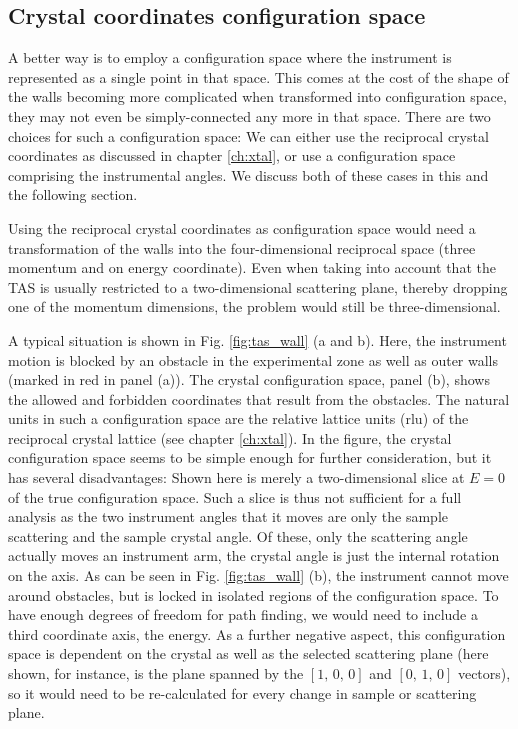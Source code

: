 \subsection{Crystal coordinates configuration space}
A better way is to employ a configuration space where the instrument is represented 
as a single point in that space. 
This comes at the cost of the shape of the walls becoming more complicated when 
transformed into configuration space, they may not even be simply-connected 
any more in that space. 
There are two choices for such a configuration space: We can either use the 
reciprocal crystal coordinates as discussed in chapter \ref{ch:xtal}, or use a 
configuration space comprising the instrumental angles.
We discuss both of these cases in this and the following section.

Using the reciprocal crystal coordinates as configuration space would need a 
transformation of the walls into the four-dimensional reciprocal space 
(three momentum and on energy coordinate). Even when taking into account that 
the TAS is usually restricted to a two-dimensional scattering plane, thereby 
dropping one of the momentum dimensions, the problem would still be three-dimensional.

A typical situation is shown in Fig. \ref{fig:tas_wall} (a and b). 
Here, the instrument motion is blocked by an obstacle in the experimental zone
as well as outer walls (marked in red in panel (a)).
The crystal configuration space, panel (b), shows the allowed and forbidden
coordinates that result from the obstacles. The natural units in such a
configuration space are the relative lattice units (rlu) of the reciprocal
crystal lattice (see chapter \ref{ch:xtal}).
In the figure, the crystal configuration space seems to be simple enough for 
further consideration, but it has several disadvantages: Shown here is merely
a two-dimensional slice at $E = 0$ of the true configuration space.
Such a slice is thus not sufficient for a full analysis as the two instrument
angles that it moves are only the sample scattering and the sample crystal angle.
Of these, only the scattering angle actually moves an instrument arm, the crystal
angle is just the internal rotation on the axis.
As can be seen in Fig. \ref{fig:tas_wall} (b), the instrument cannot move
around obstacles, but is locked in isolated regions of the configuration space.
To have enough degrees of freedom for path finding, we would need to include
a third coordinate axis, the energy.
As a further negative aspect, this configuration space is dependent on the 
crystal as well as the selected scattering plane (here shown, for instance, 
is the plane spanned by the $\left[1,\,0,\,0\right]$ and $\left[0,\,1,\,0\right]$ 
vectors), so it would need to be re-calculated for every change in sample or 
scattering plane.


